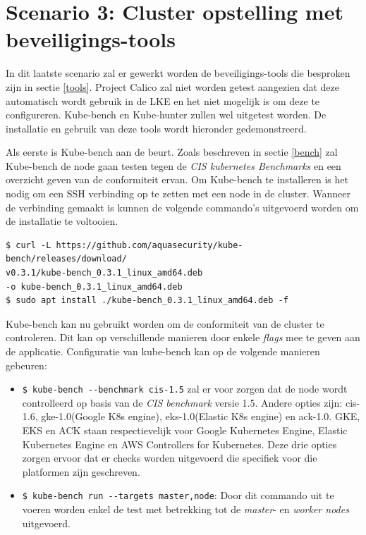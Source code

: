 \clearpage
\section{Scenario 3: Cluster opstelling met beveiligings-tools}
In dit laatste scenario zal er gewerkt worden de beveiligings-tools die besproken zijn in sectie \ref{tools}. Project Calico zal niet worden getest aangezien dat deze automatisch wordt gebruik in de LKE en het niet mogelijk is om deze te configureren. Kube-bench en Kube-hunter zullen wel uitgetest worden. De installatie en gebruik van deze tools wordt hieronder gedemonstreerd.

Als eerste is Kube-bench aan de beurt. Zoals beschreven in sectie \ref{bench} zal Kube-bench de node gaan testen tegen de \textit{CIS kubernetes Benchmarks} en een overzicht geven van de conformiteit ervan. Om Kube-bench te installeren is het nodig om een SSH verbinding op te zetten met een node in de cluster. Wanneer de verbinding gemaakt is kunnen de volgende commando's uitgevoerd worden om de installatie te voltooien.

\begin{verbatim} 
$ curl -L https://github.com/aquasecurity/kube-bench/releases/download/
v0.3.1/kube-bench_0.3.1_linux_amd64.deb
-o kube-bench_0.3.1_linux_amd64.deb
$ sudo apt install ./kube-bench_0.3.1_linux_amd64.deb -f
\end{verbatim}

Kube-bench kan nu gebruikt worden om de conformiteit van de cluster te controleren. Dit kan op verschillende manieren door enkele \textit{flags} mee te geven aan de applicatie. Configuratie van kube-bench kan op de volgende manieren gebeuren:
\begin{itemize}
	\item \verb|$ kube-bench --benchmark cis-1.5| zal er voor zorgen dat de node wordt controlleerd op basis van de \textit{CIS benchmark} versie 1.5. Andere opties zijn: cis-1.6, gke-1.0(Google K8s engine), eks-1.0(Elastic K8s engine) en ack-1.0. GKE, EKS en ACK staan respectievelijk voor Google Kubernetes Engine, Elastic Kubernetes Engine en AWS Controllers for Kubernetes. Deze drie opties zorgen ervoor dat er checks worden uitgevoerd die specifiek voor die platformen zijn geschreven.
	\item \verb|$ kube-bench run --targets master,node|: Door dit commando uit te voeren worden enkel de test met betrekking tot de \textit{master}- en \textit{worker nodes} uitgevoerd.
\end{itemize}

